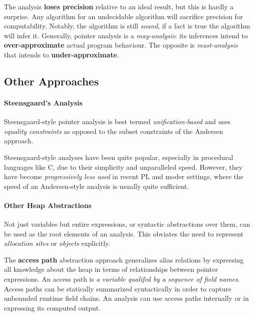 The analysis \textbf{loses precision} relative to an ideal result, but
this is hardly a surprise. Any algorithm for an undecidable algorithm
will sacrifice precision for computability. Notably, the algorithm is
still \textit{sound}, if a fact is true the algorithm will infer
it. Generally, pointer analysis is a \textit{may-analysis}: its
inferences intend to \textbf{over-approximate} actual program
behaviour. The opposite is \textit{must-analysis} that intends to
\textbf{under-approximate}.




\subsection{Other Approaches}

\paragraph{Steensgaard's Analysis}

Steensgaard-style pointer analysis is best termed
\textit{unification-based} and uses \textit{equality constraints} as
opposed to the subset constraints of the Andersen approach.

Steensgaard-style analyses have been quite popular, especially in
procedural languages like C, due to their simplicity and unparalleled
speed. However, they have become \textit{progressively less used} in
recent PL and moder settings, where the speed of an Andersen-style
analysis is usually quite sufficient.



\paragraph{Other Heap Abstractions}

Not just variables but entire expressions, or syntactic abstractions
over them, can be used as the root elements of an analysis. This
obviates the need to represent \textit{allocation sites} or
\textit{objects} explicitly.

The \textbf{access path} abstraction approach generalizes alias
relations by expressing all knowledge about the heap in terms of
relationships between pointer expressions. An access path is \textit{a
  variable qualifed by a sequence of field names}. Access paths can be
statically summarized syntactically in order to capture unbounded
runtime field chains. An analysis can use access paths internally or
in expressing its computed output.



